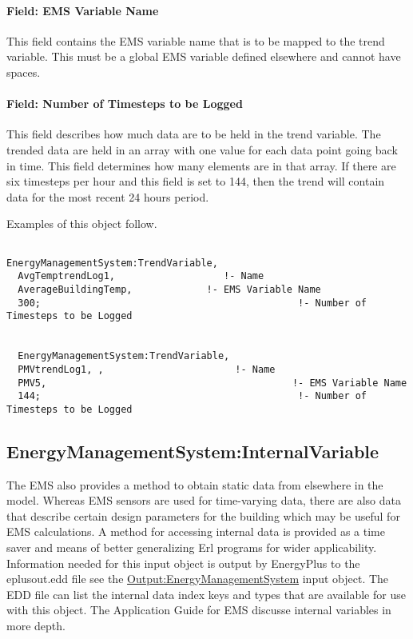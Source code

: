 \paragraph{Field: EMS Variable Name}\label{field-ems-variable-name-2}

This field contains the EMS variable name that is to be mapped to the trend variable. This must be a global EMS variable defined elsewhere and cannot have spaces.

\paragraph{Field: Number of Timesteps to be Logged}\label{field-number-of-timesteps-to-be-logged}

This field describes how much data are to be held in the trend variable. The trended data are held in an array with one value for each data point going back in time. This field determines how many elements are in that array. If there are six timesteps per hour and this field is set to 144, then the trend will contain data for the most recent 24 hours period.

Examples of this object follow.

\begin{lstlisting}

EnergyManagementSystem:TrendVariable,
  AvgTemptrendLog1,                   !- Name
  AverageBuildingTemp,             !- EMS Variable Name
  300;                                             !- Number of Timesteps to be Logged


  EnergyManagementSystem:TrendVariable,
  PMVtrendLog1, ,                       !- Name
  PMV5,                                           !- EMS Variable Name
  144;                                             !- Number of Timesteps to be Logged
\end{lstlisting}

\subsection{EnergyManagementSystem:InternalVariable}\label{energymanagementsysteminternalvariable}

The EMS also provides a method to obtain static data from elsewhere in the model. Whereas EMS sensors are used for time-varying data, there are also data that describe certain design parameters for the building which may be useful for EMS calculations. A method for accessing internal data is provided as a time saver and means of better generalizing Erl programs for wider applicability. Information needed for this input object is output by EnergyPlus to the eplusout.edd file see the \hyperref[outputenergymanagementsystem]{Output:EnergyManagementSystem} input object. The EDD file can list the internal data index keys and types that are available for use with this object. The Application Guide for EMS discusse internal variables in more depth.

